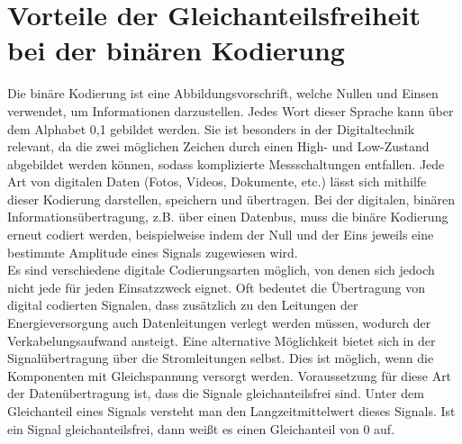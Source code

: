 \section{Vorteile der Gleichanteilsfreiheit bei der binären Kodierung}
Die binäre Kodierung ist eine Abbildungsvorschrift, welche Nullen und Einsen verwendet,
um Informationen darzustellen. Jedes Wort dieser Sprache kann über dem Alphabet {0,1} gebildet werden.
Sie ist besonders in der Digitaltechnik relevant, da die zwei möglichen Zeichen durch
einen High- und Low-Zustand abgebildet werden können, sodass komplizierte Messschaltungen entfallen. \autocite{Fricke2003}
Jede Art von digitalen Daten (Fotos, Videos, Dokumente, etc.) lässt sich mithilfe dieser Kodierung
darstellen, speichern und übertragen.
Bei der digitalen, binären Informationsübertragung, z.B. über einen Datenbus, muss die binäre Kodierung erneut
codiert werden, beispielweise indem der Null und der Eins jeweils eine bestimmte Amplitude eines 
Signals zugewiesen wird. \\
Es sind verschiedene digitale Codierungsarten möglich, von denen sich jedoch nicht jede für jeden Einsatzzweck eignet.
Oft bedeutet die Übertragung von digital codierten Signalen, dass zusätzlich zu den Leitungen der Energieversorgung auch 
Datenleitungen verlegt werden müssen, wodurch der Verkabelungsaufwand ansteigt. Eine alternative Möglichkeit bietet sich 
in der Signalübertragung über die Stromleitungen selbst. Dies ist möglich, wenn die Komponenten mit Gleichspannung versorgt werden.
Voraussetzung für diese Art der Datenübertragung ist, dass die Signale gleichanteilsfrei sind.
Unter dem Gleichanteil eines Signals versteht man den Langzeitmittelwert dieses Signals. Ist ein Signal gleichanteilsfrei, dann
weißt es einen Gleichanteil von 0 auf.
